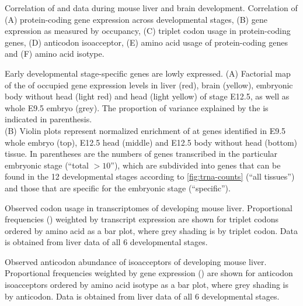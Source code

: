     {Correlation of \rnaseq and  \chipseq data during mouse liver and brain
    development.}
    {Correlation of (A) protein-coding gene expression across developmental
    stages, (B) \trna gene expression as measured by  occupancy, (C)
    triplet codon usage in protein-coding genes, (D) \trna anticodon
    isoacceptor, (E) amino acid usage of protein-coding genes and (F) \trna
    amino acid isotype.}

    {Early developmental stage-specific \trna genes are lowly expressed.}
    {(A) Factorial map of the \pca of  occupied \trna gene expression
    levels in liver (red), brain (yellow), embryonic body without head (light
    red) and head (light yellow) of stage E12.5, as well as whole E9.5 embryo
    (grey). The proportion of variance explained by the  is indicated
    in parenthesis.\\
    (B) Violin plots represent normalized enrichment of  at \trna genes
    identified in E9.5 whole embryo (top), E12.5 head (middle) and E12.5 body
    without head (bottom) tissue. In parentheses are the numbers of \trna genes
    transcribed in the particular embryonic stage (“total \(>10\)”), which are
    subdivided into \trna genes that can be found in the \num{12} developmental
    stages according to \cref{fig:trna-counts} (“all tissues”) and those that
    are specific for the embryonic stage (“specific”).}

    {Observed codon usage in \mrna transcriptomes of developing mouse liver.}
    {Proportional frequencies (\rcu) weighted by transcript expression are shown
    for triplet codons ordered by amino acid as a bar plot, where grey shading
    is by triplet codon. Data is obtained from liver \rnaseq data of all \num{6}
    developmental stages.}

    {Observed anticodon abundance of \trna isoacceptors of developing mouse
    liver.}
    {Proportional frequencies weighted by \trna gene expression (\raa) are shown
    for anticodon isoacceptors ordered by amino acid isotype as a bar plot,
    where grey shading is by anticodon. Data is obtained from liver 
    \chipseq data of all \num{6} developmental stages.}

